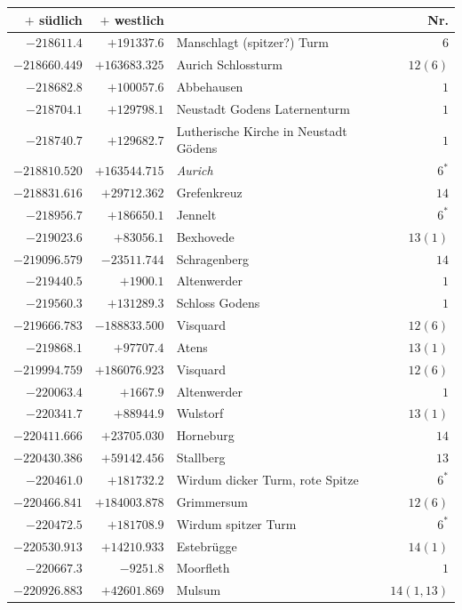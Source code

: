 \clearpage
\begin{center}\begingroup\fontsize{8}{9}\selectfont
\setlength{\tabcolsep}{4pt}
\begin{tabular}{r|r|p{170pt}|r}\hline
\(+\) südlich&\(+\) westlich&&Nr.\\\hline
\(-218611.4\)&\(+191337.6\)&Manschlagt (spitzer?) Turm&\(6\)\\
\(-218660.449\)&\(+163683.325\)&Aurich Schlossturm&\(12 (6)\)\\
\(-218682.8\)&\(+100057.6\)&Abbehausen&\(1\)\\
\(-218704.1\)&\(+129798.1\)&Neustadt Godens Laternenturm&\(1\)\\
\(-218740.7\)&\(+129682.7\)&Lutherische Kirche in Neustadt Gödens&\(1\)\\
\(-218810.520\)&\(+163544.715\)&\textit{Aurich}&\(6^{*}\)\\
\(-218831.616\)&\(+29712.362\)&Grefenkreuz&\(14\)\\
\(-218956.7\)&\(+186650.1\)&Jennelt&\(6^{*}\)\\
\(-219023.6\)&\(+83056.1\)&Bexhovede&\(13 (1)\)\\
\(-219096.579\)&\(-23511.744\)&Schragenberg&\(14\)\\
\(-219440.5\)&\(+1900.1\)&Altenwerder&\(1\)\\
\(-219560.3\)&\(+131289.3\)&Schloss Godens&\(1\)\\
\(-219666.783\)&\(-188833.500\)&Visquard&\(12 (6)\)\\
\(-219868.1\)&\(+97707.4\)&Atens&\(13 (1)\)\\
\(-219994.759\)&\(+186076.923\)&Visquard&\(12 (6)\)\\
\(-220063.4\)&\(+1667.9\)&Altenwerder&\(1\)\\
\(-220341.7\)&\(+88944.9\)&Wulstorf&\(13 (1)\)\\
\(-220411.666\)&\(+23705.030\)&Horneburg&\(14\)\\
\(-220430.386\)&\(+59142.456\)&Stallberg&\(13\)\\
\(-220461.0\)&\(+181732.2\)&Wirdum dicker Turm, rote Spitze&\(6^{*}\)\\
\(-220466.841\)&\(+184003.878\)&Grimmersum&\(12 (6)\)\\
\(-220472.5\)&\(+181708.9\)&Wirdum spitzer Turm&\(6^{*}\)\\
\(-220530.913\)&\(+14210.933\)&Estebrügge&\(14 (1)\)\\
\(-220667.3\)&\(-9251.8\)&Moorfleth&\(1\)\\
\(-220926.883\)&\(+42601.869\)&Mulsum&\(14(1,13)\)\\

\end{tabular}
\end{center}
